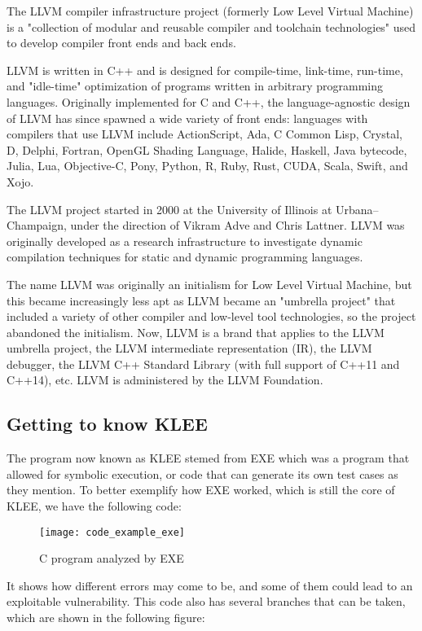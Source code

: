 The LLVM compiler infrastructure project (formerly Low Level Virtual Machine) is a "collection of modular and reusable compiler and toolchain technologies" used to develop compiler front ends and back ends.

LLVM is written in C++ and is designed for compile-time, link-time, run-time, and "idle-time" optimization of programs written in arbitrary programming languages. Originally implemented for C and C++, the language-agnostic design of LLVM has since spawned a wide variety of front ends: languages with compilers that use LLVM include ActionScript, Ada, C Common Lisp, Crystal, D, Delphi, Fortran, OpenGL Shading Language, Halide, Haskell, Java bytecode, Julia, Lua, Objective-C, Pony, Python, R, Ruby, Rust, CUDA, Scala, Swift, and Xojo.

The LLVM project started in 2000 at the University of Illinois at Urbana–Champaign, under the direction of Vikram Adve and Chris Lattner. LLVM was originally developed as a research infrastructure to investigate dynamic compilation techniques for static and dynamic programming languages.

The name LLVM was originally an initialism for Low Level Virtual Machine, but this became increasingly less apt as LLVM became an "umbrella project" that included a variety of other compiler and low-level tool technologies, so the project abandoned the initialism. Now, LLVM is a brand that applies to the LLVM umbrella project, the LLVM intermediate representation (IR), the LLVM debugger, the LLVM C++ Standard Library (with full support of C++11 and C++14), etc. LLVM is administered by the LLVM Foundation. \parencite{llvm}

\subsection{Getting to know KLEE}

The program now known as KLEE\parencite{klee} stemed from EXE \parencite{exeBook} which was a program that allowed for symbolic execution, or code that can generate its own test cases as they mention. To better exemplify how EXE worked, which is still the core of KLEE, we have the following code:

\begin{figure}[!htb]
	\caption{C program analyzed by EXE}
	\centering
	\texttt{[image: code\_example\_exe]}
\end{figure}

It shows how different errors may come to be, and some of them could lead to an exploitable vulnerability. This code also has several branches that can be taken, which are shown in the following figure:

